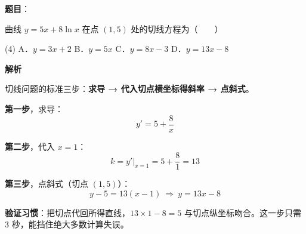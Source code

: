 \begin{answer}

\textbf{题目}：

曲线 $y=5x+8\ln x$ 在点 $(1,5)$ 处的切线方程为\mbox{（　　）}

\begin{gkopts}(4)
\task A．$y=3x+2$
\task B．$y=5x$
\task C．$y=8x-3$
\task D．$y=13x-8$
\end{gkopts}

\textbf{解析}

切线问题的标准三步：\textbf{求导 → 代入切点横坐标得斜率 → 点斜式}。

\textbf{第一步}，求导：
\nopagebreak[4]
\[y'=5+\frac{8}{x}\]

\textbf{第二步}，代入 $x=1$：
\nopagebreak[4]
\[k=y'\big|_{x=1}=5+\frac{8}{1}=13\]

\textbf{第三步}，点斜式（切点 $(1,5)$）：
\nopagebreak[4]
\[y-5=13(x-1)\ \Longrightarrow\ y=13x-8\]

\begin{gktip}
\textbf{验证习惯}：把切点代回所得直线，$13\times1-8=5$  与切点纵坐标吻合。这一步只需 3 秒，能挡住绝大多数计算失误。
\end{gktip}


\par\medskip

\end{answer}
